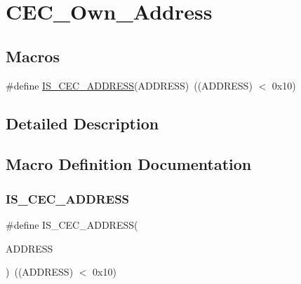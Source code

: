 \hypertarget{group___c_e_c___own___address}{}\section{C\+E\+C\+\_\+\+Own\+\_\+\+Address}
\label{group___c_e_c___own___address}
\subsection*{Macros}
\begin{DoxyCompactItemize}
\item 
\#define \mbox{\hyperlink{group___c_e_c___own___address_ga0659314b0be6092e73aa373394816557}{I\+S\+\_\+\+C\+E\+C\+\_\+\+A\+D\+D\+R\+E\+SS}}(A\+D\+D\+R\+E\+SS)~((A\+D\+D\+R\+E\+SS) $<$ 0x10)
\end{DoxyCompactItemize}


\subsection{Detailed Description}


\subsection{Macro Definition Documentation}
\mbox{\label{group___c_e_c___own___address_ga0659314b0be6092e73aa373394816557}} 
\subsubsection{\texorpdfstring{IS\_CEC\_ADDRESS}{IS\_CEC\_ADDRESS}}
{\footnotesize\ttfamily \#define I\+S\+\_\+\+C\+E\+C\+\_\+\+A\+D\+D\+R\+E\+SS(\begin{DoxyParamCaption}\item[{}]{A\+D\+D\+R\+E\+SS }\end{DoxyParamCaption})~((A\+D\+D\+R\+E\+SS) $<$ 0x10)}

